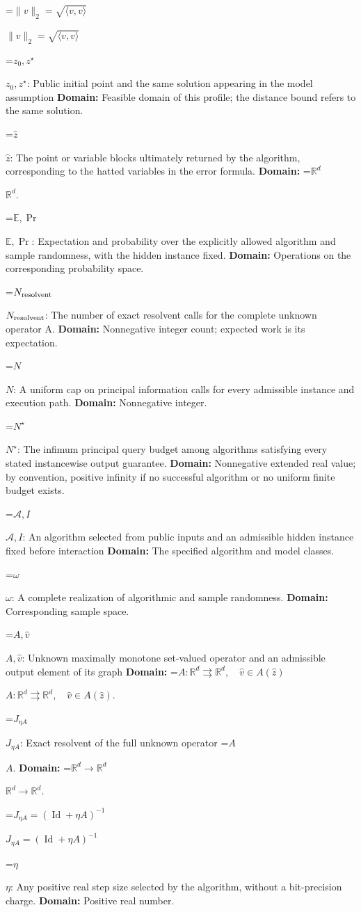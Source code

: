 \documentclass[10pt,a4paper]{article}
\newcommand{\AtlasMath}[1]{\par\begingroup\centering\setbox0=\hbox{$\displaystyle #1$}\ifdim\wd0>1.4\linewidth\typeout{ATLAS WIDE FORMULA: \the\wd0}\fi\ifdim\wd0>\linewidth\resizebox{\linewidth}{!}{\box0}\else\box0\fi\par\endgroup}
\newcommand{\AtlasInlineMath}[1]{\begingroup\setbox0=\hbox{$#1$}\ifdim\wd0>.4\linewidth\endgroup\AtlasMath{#1}\else\endgroup$#1$\fi}
\begin{document}
\AtlasInlineMath{\|v\|_2=\sqrt{\langle v,v\rangle}}

\AtlasInlineMath{z_0,z^\star}: Public initial point and the same solution appearing in the model assumption \textbf{Domain:} Feasible domain of this profile; the distance bound refers to the same solution.

\AtlasInlineMath{\widehat z}: The point or variable blocks ultimately returned by the algorithm, corresponding to the hatted variables in the error formula. \textbf{Domain:} \AtlasInlineMath{\mathbb R^d}.

\AtlasInlineMath{\mathbb E,\Pr}: Expectation and probability over the explicitly allowed algorithm and sample randomness, with the hidden instance fixed. \textbf{Domain:} Operations on the corresponding probability space.

\AtlasInlineMath{N_{\rm resolvent}}: The number of exact resolvent calls for the complete unknown operator A. \textbf{Domain:} Nonnegative integer count; expected work is its expectation.

\AtlasInlineMath{N}: A uniform cap on principal information calls for every admissible instance and execution path. \textbf{Domain:} Nonnegative integer.

\AtlasInlineMath{N^\star}: The infimum principal query budget among algorithms satisfying every stated instancewise output guarantee. \textbf{Domain:} Nonnegative extended real value; by convention, positive infinity if no successful algorithm or no uniform finite budget exists.

\AtlasInlineMath{\mathcal A,I}: An algorithm selected from public inputs and an admissible hidden instance fixed before interaction \textbf{Domain:} The specified algorithm and model classes.

\AtlasInlineMath{\omega}: A complete realization of algorithmic and sample randomness. \textbf{Domain:} Corresponding sample space.

\AtlasInlineMath{A,\widehat v}: Unknown maximally monotone set-valued operator and an admissible output element of its graph \textbf{Domain:} \AtlasInlineMath{A:\mathbb R^d\rightrightarrows\mathbb R^d,\quad\widehat v\in A(\widehat z)}.

\AtlasInlineMath{J_{\eta A}}: Exact resolvent of the full unknown operator \AtlasInlineMath{A}. \textbf{Domain:} \AtlasInlineMath{\mathbb R^d\to\mathbb R^d}.

\AtlasInlineMath{J_{\eta A}=(\operatorname{Id}+\eta A)^{-1}}

\AtlasInlineMath{\eta}: Any positive real step size selected by the algorithm, without a bit-precision charge. \textbf{Domain:} Positive real number.
\end{document}
